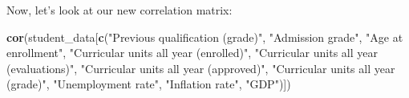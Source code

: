 \documentclass[
]{article}
\newenvironment{Shaded}{\begin{snugshade}}{\end{snugshade}}
\newcommand{\FunctionTok}[1]{\textcolor[rgb]{0.13,0.29,0.53}{\textbf{#1}}}
\newcommand{\NormalTok}[1]{#1}
\newcommand{\StringTok}[1]{\textcolor[rgb]{0.31,0.60,0.02}{#1}}
\begin{document}
Now, let's look at our new correlation matrix:

\begin{Shaded}
\begin{Highlighting}[]
\FunctionTok{cor}\NormalTok{(student\_data[}\FunctionTok{c}\NormalTok{(}\StringTok{"Previous qualification (grade)"}\NormalTok{, }\StringTok{"Admission grade"}\NormalTok{, }\StringTok{"Age at enrollment"}\NormalTok{, }\StringTok{"Curricular units all year (enrolled)"}\NormalTok{, }\StringTok{"Curricular units all year (evaluations)"}\NormalTok{, }\StringTok{"Curricular units all year (approved)"}\NormalTok{,  }\StringTok{"Curricular units all year (grade)"}\NormalTok{, }\StringTok{"Unemployment rate"}\NormalTok{, }\StringTok{"Inflation rate"}\NormalTok{, }\StringTok{"GDP"}\NormalTok{)])}
\end{Highlighting}
\end{Shaded}
\end{document}
